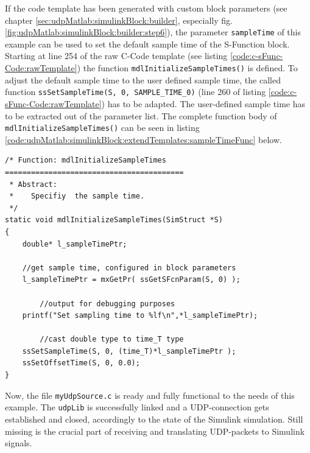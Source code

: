 If the code template has been generated with custom block parameters (see chapter \ref{sec:udpMatlab:simulinkBlock:builder}, especially fig. \ref{fig:udpMatlab:simulinkBlock:builder:step6}), the parameter \texttt{sampleTime} of this example can be used to set the default sample time of the S-Function block. Starting at line 254 of the raw C-Code template (see listing \ref{code:c-sFunc-Code:rawTemplate}) the function \texttt{mdlInitializeSampleTimes()} is defined. To adjust the default sample time to the user defined sample time, the called function \texttt{ssSetSampleTime(S, 0, SAMPLE\_TIME\_0)} (line 260 of listing \ref{code:c-sFunc-Code:rawTemplate}) has to be adapted. The user-defined sample time has to be extracted out of the parameter list. The complete function body of \texttt{mdlInitializeSampleTimes()} can be seen in listing \ref{code:udpMatlab:simulinkBlock:extendTemplates:sampleTimeFunc} below.

\begin{lstlisting}[caption={[\texttt{myUdpSource.c} extended by user-defined sample time]C-Code template file 'myUdpSource.c' extended by a user-defined sample time via block parameters (code snippet of listing \ref{code:c-sFunc-Code:rawTemplate}, lines 254 ll.)},label=code:udpMatlab:simulinkBlock:extendTemplates:sampleTimeFunc,firstnumber=254]
/* Function: mdlInitializeSampleTimes =========================================
 * Abstract:
 *    Specifiy  the sample time.
 */
static void mdlInitializeSampleTimes(SimStruct *S)
{
    double* l_sampleTimePtr;
    
    //get sample time, configured in block parameters
    l_sampleTimePtr = mxGetPr( ssGetSFcnParam(S, 0) );
		
		//output for debugging purposes
    printf("Set sampling time to %lf\n",*l_sampleTimePtr);
    
		//cast double type to time_T type
    ssSetSampleTime(S, 0, (time_T)*l_sampleTimePtr );
    ssSetOffsetTime(S, 0, 0.0);
}
\end{lstlisting}

Now, the file \texttt{myUdpSource.c} is ready and fully functional to the needs of this example. The \texttt{udpLib} is successfully linked and a UDP-connection gets established and closed, accordingly to the state of the Simulink simulation. Still missing is the crucial part of receiving and translating UDP-packets to Simulink signals.

